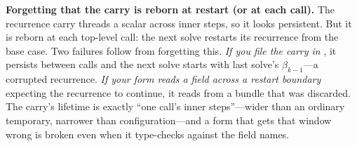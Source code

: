 \begin{pitfall}
\textbf{Forgetting that the carry is reborn at restart (or at each call).} The
recurrence carry  threads a scalar across inner steps, so it
looks persistent. But it is reborn at each top-level call: the next solve
restarts its recurrence from the base case. Two failures follow from forgetting
this. \emph{If you file the carry in }, it persists between calls
and the next solve starts with last solve's $\beta_{k-1}$---a corrupted
recurrence. \emph{If your form reads a  field across a restart
boundary} expecting the recurrence to continue, it reads from a bundle that was
discarded. The carry's lifetime is exactly ``one call's inner steps''---wider
than an ordinary temporary, narrower than configuration---and a form that gets
that window wrong is broken even when it type-checks against the field names.
\end{pitfall}

